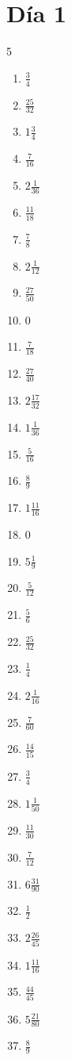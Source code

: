 \documentclass[12pt]{article}
\begin{document}
\section*{Día 1}
\begin{multicols}{5}\begin{enumerate}
\item $ \frac{3}{4} $
\item $ \frac{25}{32} $
\item $ 1 \frac{3}{4} $
\item $ \frac{7}{16} $
\item $ 2 \frac{1}{36} $
\item $ \frac{11}{18} $
\item $ \frac{7}{8} $
\item $ 2 \frac{1}{12} $
\item $ \frac{27}{50} $
\item $ 0 $
\item $ \frac{7}{18} $
\item $ \frac{27}{40} $
\item $ 2 \frac{17}{32} $
\item $ 1 \frac{1}{36} $
\item $ \frac{5}{16} $
\item $ \frac{8}{9} $
\item $ 1 \frac{11}{16} $
\item $ 0 $
\item $ 5 \frac{1}{9} $
\item $ \frac{5}{12} $
\item $ \frac{5}{6} $
\item $ \frac{25}{32} $
\item $ \frac{1}{4} $
\item $ 2 \frac{1}{16} $
\item $ \frac{7}{60} $
\item $ \frac{14}{15} $
\item $ \frac{3}{4} $
\item $ 1 \frac{1}{50} $
\item $ \frac{11}{30} $
\item $ \frac{7}{12} $
\item $ 6 \frac{31}{90} $
\item $ \frac{1}{2} $
\item $ 2 \frac{26}{45} $
\item $ 1 \frac{11}{16} $
\item $ \frac{44}{45} $
\item $ 5 \frac{21}{80} $
\item $ \frac{8}{9} $

\end{enumerate}
\end{multicols}
\end{document}
